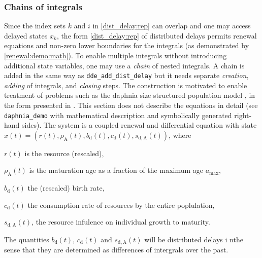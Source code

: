 \documentclass[10pt]{scrartcl}
\newcommand{\blist}[1]{\mbox{\lstinline!#1!}}
\begin{document}
\subsubsection{Chains of integrals}
\label{sec:chain:delay}
Since the index sets $k$ and $i$ in \eqref{dist_delay:rep} can overlap and
one may access delayed states $x_k$, the form \eqref{dist_delay:rep} of
distributed delays permits renewal equations and  non-zero lower
boundaries for the integrals (as demonstrated by
\eqref{renewal:demo:math}). To enable multiple integrals without
introducing additional state variables, one may use a \emph{chain} of
nested integrals. A chain is added in the same way as
\blist{dde_add_dist_delay} but it needs separate \emph{creation},
\emph{adding} of integrals, and \emph{closing} steps. The construction
is motivated to enable treatment of problems such as the daphnia size
structured population model \cite{diekmann2010daphnia}, in the form
presented in \cite{ando2020collocation}. This section does not
describe the equations in detail (see \texttt{daphnia\_demo} with
mathematical description and symbolically generated right-hand sides).
The system is a coupled renewal and differential equation with state
$x(t)=(r(t),\rho_\mathrm{A}(t),b_\mathrm{d}(t),c_\mathrm{d}(t),s_\mathrm{d,A}(t))$, where
\begin{compactitem}
\item $r(t)$ is the resource (rescaled),
\item $\rho_\mathrm{A}(t)$ is the maturation age as a fraction of the maximum age $a_{\max}$,
\item $b_\mathrm{d}(t)$ the (rescaled) birth rate,
\item $c_\mathrm{d}(t)$ the consumption rate of resources by the entire poplulation,
\item $s_\mathrm{d,A}(t)$, the resource infulence on individual growth to maturity.
\end{compactitem}
The quantities $b_\mathrm{d}(t)$, $c_\mathrm{d}(t)$ and
$s_\mathrm{d,A}(t)$ will be distributed delays i nthe sense that they
are determined as differences of intergrals over the past.
\end{document}

